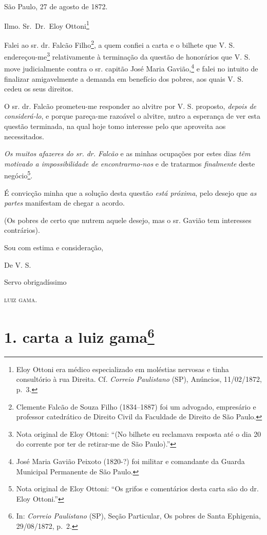 \asterisc{}

São Paulo, 27 de agosto de 1872.

Ilmo. Sr.~Dr.~Eloy Ottoni\footnote{ Eloy Ottoni era médico
  especializado em moléstias nervosas e tinha consultório à rua Direita.
  Cf. \emph{Correio Paulistano} (SP), Anúncios, 11/02/1872, p.~3.}

Falei ao sr. dr. Falcão Filho\footnote{ Clemente Falcão de Souza Filho
  (1834--1887) foi um advogado, empresário e professor catedrático de
  Direito Civil da Faculdade de Direito de São Paulo.}, a quem confiei a
carta e o bilhete que V. S. endereçou-me\footnote{ Nota original de
  Eloy Ottoni: ``(No bilhete eu reclamava resposta até o dia 20 do
  corrente por ter de retirar-me de São Paulo).''} relativamente à
terminação da questão de honorários que V. S. move judicialmente contra
o sr. capitão José Maria Gavião,\footnote{ José Maria Gavião Peixoto
  (1820-?) foi militar e comandante da Guarda Municipal Permanente de
  São Paulo.} e falei no intuito de finalizar amigavelmente a demanda em
benefício dos pobres, aos quais V. S. cedeu os seus direitos.

O sr. dr. Falcão prometeu-me responder ao alvitre por V. S. proposto,
\emph{depois de considerá-lo}, e porque pareça-me razoável o alvitre,
nutro a esperança de ver esta questão terminada, na qual hoje tomo
interesse pelo que aproveita aos necessitados.

\emph{Os muitos afazeres do sr. dr. Falcão} e as minhas ocupações por
estes dias \emph{têm motivado a impossibilidade de encontrarmo-nos} e de
tratarmos \emph{finalmente} deste negócio\footnote{ Nota original de
  Eloy Ottoni: ``Os grifos e comentários desta carta são do dr. Eloy
  Ottoni.''}.

É convicção minha que a solução desta questão \emph{está próxima}, pelo
desejo que \emph{as partes} manifestam de chegar a acordo.

(Os pobres de certo que nutrem aquele desejo, mas o sr. Gavião tem
interesses contrários).

Sou com estima e consideração,

De V. S.

Servo obrigadíssimo

\textsc{luiz gama}.

\chapter{1. carta a luiz gama\footnote{ In: \emph{Correio Paulistano} (SP), Seção Particular, Os
  pobres de Santa Ephigenia, 29/08/1872, p.~2.}} %

